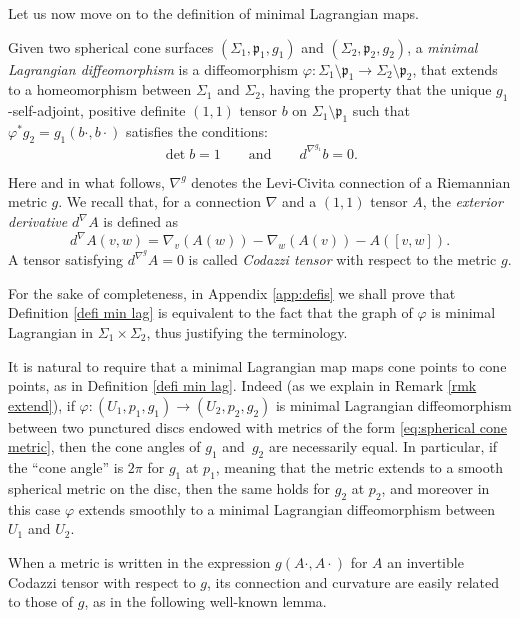 Let us now move on to the definition of minimal Lagrangian maps.

\begin{defi} \label{defi min lag}
Given two spherical cone surfaces $(\Sigma_1,\mathfrak p_1,g_1)$ and $(\Sigma_2,\mathfrak p_2,g_2)$, a \emph{minimal Lagrangian diffeomorphism} is a diffeomorphism $\varphi:\Sigma_1\setminus\mathfrak p_1\to\Sigma_2\setminus\mathfrak p_2$, that extends to a homeomorphism between $\Sigma_1$ and $\Sigma_2$, having the property that the unique $g_1$-self-adjoint, positive definite $(1,1)$ tensor $b$ on $\Sigma_1\setminus \mathfrak p_1$ such that $\varphi^*g_2=g_1(b\cdot,b\cdot)$ satisfies the conditions:
\begin{equation}\label{eq:defi min lag}
\det b=1\qquad\text{and}\qquad d^{\nabla^{g_1}}\!b=0.
\end{equation}
\end{defi}

Here and in what follows, $\nabla^g$ denotes the Levi-Civita connection of a Riemannian metric $g$. We recall that, for a connection $\nabla$ and a $(1,1)$ tensor $A$, the \emph{exterior derivative} $d^\nabla \!\!A$ is defined as
\[
d^\nabla \!\!A(v,w)=\nabla_v(A(w))-\nabla_w(A(v))-A([v,w]).
\]
A tensor satisfying $d^{\nabla^g}\!\!A=0$ is called \emph{Codazzi tensor} with respect to the metric $g$.

For the sake of completeness, in Appendix \ref{app:defis} we shall prove that Definition \ref{defi min lag} is equivalent to the fact that the graph of $\varphi$ is minimal Lagrangian in $\Sigma_1\times\Sigma_2$, thus justifying the terminology.

\begin{remark}
It is natural to require that a minimal Lagrangian map maps cone points to cone points, as in Definition \ref{defi min lag}. Indeed (as we explain in Remark \ref{rmk extend}), if $\varphi:(U_1,p_1,g_1)\to (U_2,p_2,g_2)$ is minimal Lagrangian diffeomorphism between two punctured discs endowed with metrics of the form \eqref{eq:spherical cone metric}, then the cone angles of $g_1$ and~$g_2$ are necessarily equal. In particular, if the ``cone angle'' is $2\pi$ for $g_1$ at $p_1$, meaning that the metric extends to a smooth spherical metric on the disc, then the same holds for $g_2$ at $p_2$, and moreover in this case $\varphi$ extends smoothly to a minimal Lagrangian diffeomorphism between $U_1$ and $U_2$.
\end{remark}

When a metric is written in the expression $g(A\cdot,A\cdot)$ for $A$ an invertible Codazzi tensor with respect to $g$, its connection and curvature are easily related to those of $g$, as in the following well-known lemma.

